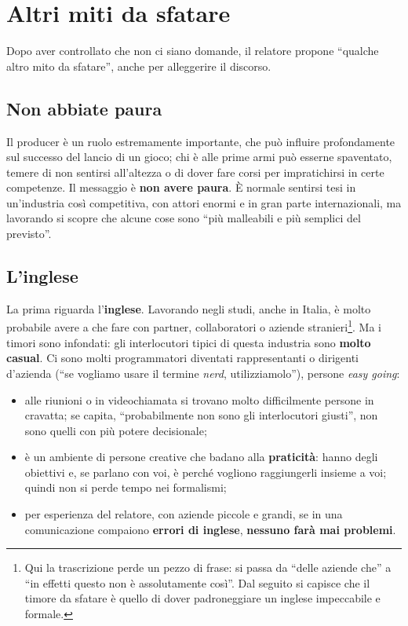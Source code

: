 \section{Altri miti da sfatare}
\label{sec:z5-altri-miti}

Dopo aver controllato che non ci siano domande, il relatore propone ``qualche
altro mito da sfatare'', anche per alleggerire il discorso.

\subsection{Non abbiate paura}

Il producer è un ruolo estremamente importante, che può influire profondamente
sul successo del lancio di un gioco; chi è alle prime armi può esserne
spaventato, temere di non sentirsi all'altezza o di dover fare corsi per
impratichirsi in certe competenze. Il messaggio è \textbf{non avere paura}. È
normale sentirsi tesi in un'industria così competitiva, con attori enormi e in
gran parte internazionali, ma lavorando si scopre che alcune cose sono ``più
malleabili e più semplici del previsto''.

\subsection{L'inglese}

La prima riguarda l'\textbf{inglese}. Lavorando negli studi, anche in Italia, è
molto probabile avere a che fare con partner, collaboratori o aziende
stranieri\footnote{Qui la trascrizione perde un pezzo di frase: si passa da
``delle aziende che'' a ``in effetti questo non è assolutamente così''. Dal
seguito si capisce che il timore da sfatare è quello di dover padroneggiare un
inglese impeccabile e formale.}. Ma i timori sono infondati: gli interlocutori
tipici di questa industria sono \textbf{molto casual}. Ci sono molti
programmatori diventati rappresentanti o dirigenti d'azienda (``se vogliamo
usare il termine \emph{nerd}, utilizziamolo''), persone \emph{easy going}:
\begin{itemize}
  \item alle riunioni o in videochiamata si trovano molto difficilmente persone
        in cravatta; se capita, ``probabilmente non sono gli interlocutori
        giusti'', non sono quelli con più potere decisionale;
  \item è un ambiente di persone creative che badano alla \textbf{praticità}:
        hanno degli obiettivi e, se parlano con voi, è perché vogliono
        raggiungerli insieme a voi; quindi non si perde tempo nei formalismi;
  \item per esperienza del relatore, con aziende piccole e grandi, se in una
        comunicazione compaiono \textbf{errori di inglese}, \textbf{nessuno farà
        mai problemi}.
\end{itemize}


